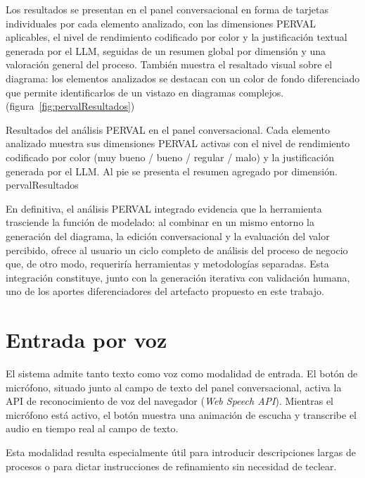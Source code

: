 Los resultados se presentan en el panel conversacional en forma de tarjetas individuales por cada elemento analizado, con las dimensiones PERVAL aplicables, el nivel de rendimiento codificado por color y la justificación textual generada por el LLM, seguidas de un resumen global por dimensión y una valoración general del proceso. También muestra el resaltado visual sobre el diagrama: los elementos analizados se destacan con un color de fondo diferenciado que permite identificarlos de un vistazo en diagramas complejos.
(figura~\ref{fig:pervalResultados})

%
  {Resultados del análisis PERVAL en el panel conversacional. Cada elemento analizado muestra sus dimensiones PERVAL activas con el nivel de rendimiento codificado por color (muy bueno / bueno / regular / malo) y la justificación generada por el LLM. Al pie se presenta el resumen agregado por dimensión.}%
  {pervalResultados}

En definitiva, el análisis PERVAL integrado evidencia que la herramienta trasciende la función de modelado: al combinar en un mismo entorno la generación del diagrama, la edición conversacional y la evaluación del valor percibido, ofrece al usuario un ciclo completo de análisis del proceso de negocio que, de otro modo, requeriría herramientas y metodologías separadas. Esta integración constituye, junto con la generación iterativa con validación humana, uno de los aportes diferenciadores del artefacto propuesto en este trabajo.




\section{Entrada por voz}
\label{sec:demoVoz}

El sistema admite tanto texto como voz como modalidad de entrada. El botón de micrófono, situado junto al campo de texto del panel conversacional, activa la API de reconocimiento de voz del navegador (\textit{Web Speech API}). Mientras el micrófono está activo, el botón muestra una animación de escucha y transcribe el audio en tiempo real al campo de texto.

Esta modalidad resulta especialmente útil para introducir descripciones largas de procesos o para dictar instrucciones de refinamiento sin necesidad de teclear.

